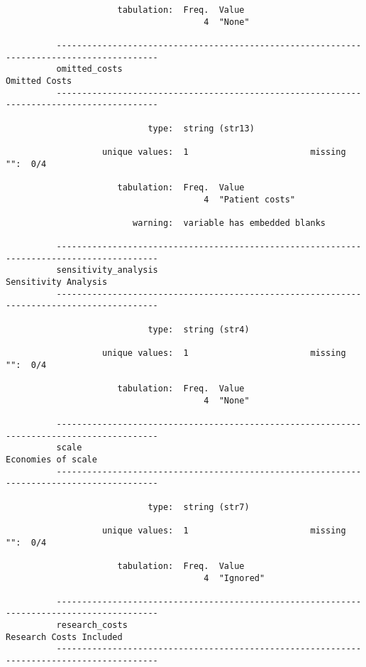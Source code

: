 \documentclass{article}
\begin{document}
\begin{verbatim}
                      tabulation:  Freq.  Value
                                       4  "None"
          
          ------------------------------------------------------------------------------------------
          omitted_costs                                                                Omitted Costs
          ------------------------------------------------------------------------------------------
          
                            type:  string (str13)
          
                   unique values:  1                        missing "":  0/4
          
                      tabulation:  Freq.  Value
                                       4  "Patient costs"
          
                         warning:  variable has embedded blanks
          
          ------------------------------------------------------------------------------------------
          sensitivity_analysis                                                  Sensitivity Analysis
          ------------------------------------------------------------------------------------------
          
                            type:  string (str4)
          
                   unique values:  1                        missing "":  0/4
          
                      tabulation:  Freq.  Value
                                       4  "None"
          
          ------------------------------------------------------------------------------------------
          scale                                                                   Economies of scale
          ------------------------------------------------------------------------------------------
          
                            type:  string (str7)
          
                   unique values:  1                        missing "":  0/4
          
                      tabulation:  Freq.  Value
                                       4  "Ignored"
          
          ------------------------------------------------------------------------------------------
          research_costs                                                     Research Costs Included
          ------------------------------------------------------------------------------------------
          

\end{verbatim}
\end{document}
